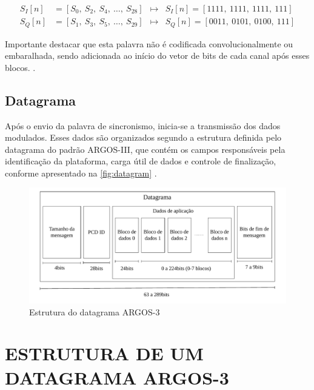 \vspace{-1em}
\begin{equation}
\begin{aligned}
    S_I[n] &= [S_0,\ S_2,\ S_4,\ \dots,\ S_{28}] &\mapsto&  S_I[n] = [1111,\ 1111,\ 1111,\ 111]     \\
    S_Q[n] &= [S_1,\ S_3,\ S_5,\ \dots,\ S_{29}] &\mapsto&  S_Q[n] = [0011,\ 0101,\ 0100,\ 111]
\end{aligned}
\label{eq:intercalacao}
\end{equation}

\noindent Importante destacar que esta palavra não é codificada convolucionalmente ou embaralhada, sendo adicionada ao início do vetor de bits de cada canal após esses blocos.  \cite{cnes_services_and_message_formats_ed2_rev2_2006}. 

\subsection{Datagrama}\label{sec:datagrama}

Após o envio da palavra de sincronismo, inicia-se a transmissão dos dados modulados. Esses dados são organizados segundo a estrutura definida pelo datagrama do padrão \gls{ARGOS-III}, que contém os campos responsáveis pela identificação da plataforma, carga útil de dados e controle de finalização, conforme apresentado na \autoref{fig:datagram} \cite{cnes_services_and_message_formats_ed2_rev2_2006}.

\begin{figure}[H]
	\centering
	\caption{Estrutura do datagrama ARGOS-3}\label{fig:datagram}
	\includegraphics[width=\linewidth]{assets/cap2/datagram.pdf}
    
\end{figure}

\section{ESTRUTURA DE UM DATAGRAMA ARGOS-3}

